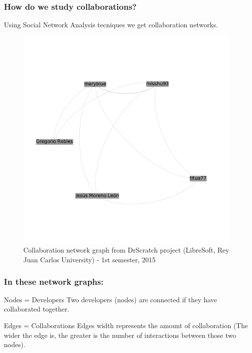 \documentclass{beamer}
\begin{document}
\begin{frame}
\frametitle{How do we study collaborations?}
Using Social Network Analysis tecniques we get collaboration networks.
\begin{figure}
\includegraphics[scale=0.17]{example-graph1.png}
\caption{Collaboration network graph from DrScratch project 
(LibreSoft, Rey Juan Carlos University) - 1st semester, 2015}
\end{figure}
\end{frame}


\begin{frame}
\frametitle{In these network graphs:}
\begin{block}{Nodes = Developers}
Two developers (nodes) are connected if they have collaborated together.
\end{block}

\begin{block}{Edges = Collaborations}
Edges width represents the amount of collaboration
(The wider the edge is, the greater is the number of interactions between those two nodes).
\end{block}

\end{frame}

\end{document}
